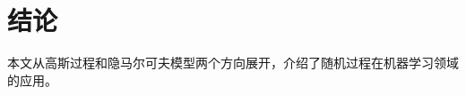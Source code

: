 \documentclass[degree=project, degree-type=project]{thuthesis}
\begin{document}
\chapter{结论}
\label{chap:conclusion}

本文从高斯过程和隐马尔可夫模型两个方向展开，介绍了随机过程在机器学习领域的应用。

\backmatter



\appendix
\end{document}
